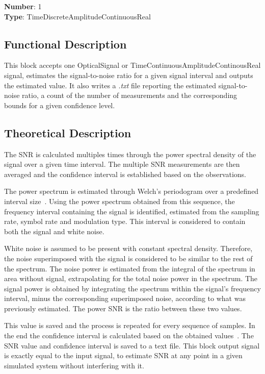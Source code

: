\begin{refsection}
\textbf{Number}: 1\\
\textbf{Type}: TimeDiscreteAmplitudeContinuousReal

\subsection*{Functional Description}

This block accepts one OpticalSignal or TimeContinuousAmplitudeContinousReal signal, estimates the signal-to-noise ratio for a given signal interval and outputs the estimated value. It also writes a \textit{.txt} file reporting the estimated signal-to-noise ratio, a count of the number of measurements and the corresponding bounds for a given confidence level.

\subsection*{Theoretical Description}\label{snrcalc}
The SNR is calculated multiples times through the power spectral density of the signal over a given time interval. The multiple SNR measurements are then averaged and the confidence interval is established based on the observations.

The power spectrum is estimated through Welch's periodogram over a predefined interval size~\cite{john2007digital}. Using the power spectrum obtained from this sequence, the frequency interval containing the signal is identified, estimated from the sampling rate, symbol rate and modulation type. This interval is considered to contain both the signal and white noise.

White noise is assumed to be present with constant spectral density. Therefore, the noise superimposed with the signal is considered to be similar to the rest of the spectrum. The noise power is estimated from the integral of the spectrum in area without signal, extrapolating for the total noise power in the spectrum. The signal power is obtained by integrating the spectrum within the signal's frequency interval, minus the corresponding superimposed noise, according to what was previously estimated. The power SNR is the ratio between these two values.

This value is saved and the process is repeated for every sequence of samples. In the end the confidence interval is calculated based on the obtained values~\cite{tranter2004principles}. The SNR value and confidence interval is saved to a text file.
This block output signal is exactly equal to the input signal, to estimate SNR at any point in a given simulated system without interfering with it.


\end{refsection}
